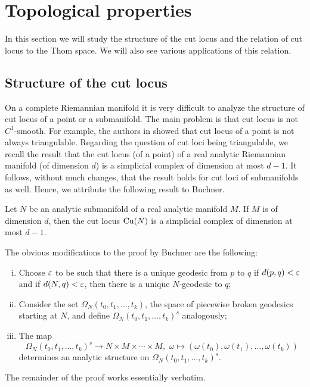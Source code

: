 \section{Topological properties}\label{sec:topologicalProperties}
\hfb In this section we will study the structure of the cut locus and the relation of cut locus to the Thom space. We will also see various applications of this relation.
\subsection{Structure of the cut locus}
\hfb On a complete Riemannian manifold it is very difficult to analyze the structure of cut locus of a point or a submanifold. The main problem is that cut locus is not $C^1$-smooth. For example, the authors in \cite{GlSi78} showed that cut locus of a point is not always triangulable. Regarding the question of cut loci being triangulable, we recall the result \cite{Buc77} that the cut locus (of a point) of a real analytic Riemannian manifold (of dimension $d$) is a simplicial complex of dimension at most $d-1$. It follows, without much changes, that the result holds for cut loci of submanifolds as well. Hence, we attribute the following result to Buchner. 

\begin{thm}[Buchner 1977]\label{Buchner}
    Let $N$ be an analytic submanifold of a real analytic manifold $M$. If $M$ is of dimension $d$, then the cut locus $\mathrm{Cu}(N)$ is a simplicial complex of dimension at most $d-1$.
\end{thm}
\vspace{0.3cm}
\noindent The obvious modifications to the proof by Buchner are the following:
\begin{enumerate}[(i)]
    \item Choose $\varepsilon$ to be such that there is a unique geodesic from $p$ to $q$ if $d(p,q)<\varepsilon$ and if $d(N,q)<\varepsilon$, then there is a unique $N$-geodesic to $q$;
    \item  Consider the set $\Omega_N(t_0,t_1,\ldots,t_k)$, the space of piecewise broken geodesics starting at $N$, and define $\Omega_N(t_0,t_1,\ldots,t_k)^s$ analogously;
    \item The map
    \begin{displaymath}
        \Omega_N(t_0,t_1,\ldots,t_k)^s\to N\times M\times \cdots\times M,\,\,\omega\mapsto (\omega(t_0),\omega(t_1),\ldots,\omega(t_k))
    \end{displaymath}
    determines an analytic structure on $\Omega_N(t_0,t_1,\ldots,t_k)^s$.
\end{enumerate}
The remainder of the proof works essentially verbatim.

